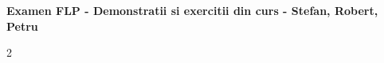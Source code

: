 \documentclass[10pt,a4paper]{article}
\begin{document}
\begin{center}
	{\large\sffamily\bfseries Examen FLP - Demonstratii si exercitii din curs - Stefan, Robert, Petru}
\end{center}
\vspace{-0.6em}

\begin{multicols*}{2}
	
	
	
	
		
		
		
\end{multicols*}

\clearpage

\end{document}
